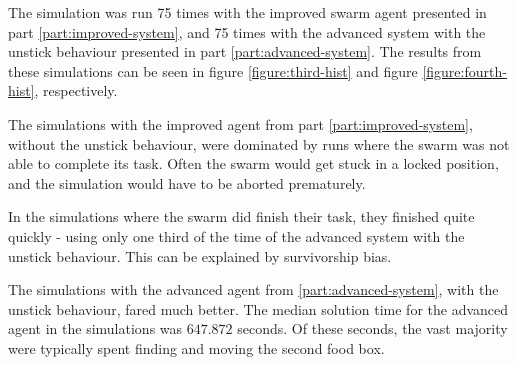 \documentclass[a4paper]{article}
\begin{document}
The simulation was run 75 times with the improved swarm agent presented in part \vref{part:improved-system}, and 75 times with the advanced system with the unstick behaviour presented in part \vref{part:advanced-system}.
The results from these simulations can be seen in figure \vref{figure:third-hist} and figure \vref{figure:fourth-hist}, respectively.

The simulations with the improved agent from part \ref{part:improved-system}, without the unstick behaviour, were dominated by runs where the swarm was not able to complete its task.
Often the swarm would get stuck in a locked position, and the simulation would have to be aborted prematurely.

In the simulations where the swarm did finish their task, they finished quite quickly - using only one third of the time of the advanced system with the unstick behaviour.
This can be explained by survivorship bias.

The simulations with the advanced agent from \ref{part:advanced-system}, with the unstick behaviour, fared much better.
The median solution time for the advanced agent in the simulations was $ 647.872 $ seconds.
Of these seconds, the vast majority were typically spent finding and moving the second food box.



\newpage
{}


\end{document}
